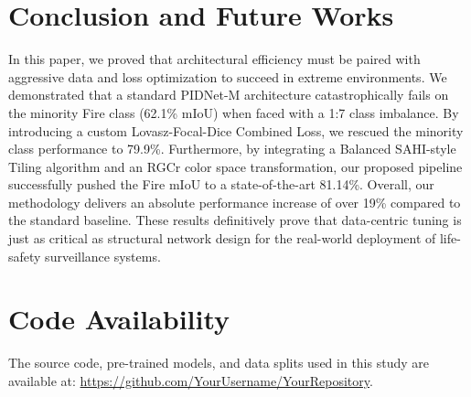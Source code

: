 \documentclass[conference]{IEEEtran}
\begin{document}
\section{Conclusion and Future Works}
In this paper, we proved that architectural efficiency must be paired with aggressive data and loss optimization to succeed in extreme environments. We demonstrated that a standard PIDNet-M architecture catastrophically fails on the minority Fire class (62.1\% mIoU) when faced with a 1:7 class imbalance. By introducing a custom Lovasz-Focal-Dice Combined Loss, we rescued the minority class performance to 79.9\%. Furthermore, by integrating a Balanced SAHI-style Tiling algorithm and an RGCr color space transformation, our proposed pipeline successfully pushed the Fire mIoU to a state-of-the-art 81.14\%. Overall, our methodology delivers an absolute performance increase of over 19\% compared to the standard baseline. These results definitively prove that data-centric tuning is just as critical as structural network design for the real-world deployment of life-safety surveillance systems.

\section*{Code Availability}
The source code, pre-trained models, and data splits used in this study are available at: \url{https://github.com/YourUsername/YourRepository}.
\end{document}
